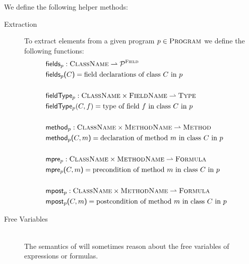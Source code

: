 We define the following helper methods:

\begin{description}
    \item[Extraction]
    To extract elements from a given program $p \in \textup{\textsc{Program}}$ we define the following functions:
    \begin{align*}
         & \textup{\textmd{\textsf{fields$_p$}}} : \textup{\textsc{ClassName}} \rightharpoonup \mathcal{P}^{\textup{\textsc{Field}}}                  &  \\
         & \textup{\textmd{\textsf{fields$_p$($C$)}}} = \text{field declarations of class $C$ in $p$}                              &  \\
         & ~                                                                                       &  \\
    	 & \textup{\textmd{\textsf{fieldType$_p$}}} : \textup{\textsc{ClassName}} \times \textup{\textsc{FieldName}} \rightharpoonup \textup{\textsc{Type}}                & ~ \\
    	 & \textup{\textmd{\textsf{fieldType$_p$}}}(C, f) = \text{type of field $f$ in class $C$ in $p$}                         &  \\
    	 & ~                                                                                       &  \\
    	 & \textup{\textmd{\textsf{method$_p$}}} : \textup{\textsc{ClassName}} \times \textup{\textsc{MethodName}} \rightharpoonup \textup{\textsc{Method}} &  \\
    	 & \textup{\textmd{\textsf{method$_p$($C, m$)}}} = \text{declaration of method $m$ in class $C$ in $p$}                   &  \\
    	 & ~                                                                                       &  \\
    	 & \textup{\textmd{\textsf{mpre$_p$}}} : \textup{\textsc{ClassName}} \times \textup{\textsc{MethodName}} \rightharpoonup \textup{\textsc{Formula}}  &  \\
    	 & \textup{\textmd{\textsf{mpre$_p$($C, m$)}}} = \text{precondition of method $m$ in class $C$ in $p$}                    &  \\
    	 & ~                                                                                       &  \\
    	 & \textup{\textmd{\textsf{mpost$_p$}}} : \textup{\textsc{ClassName}} \times \textup{\textsc{MethodName}} \rightharpoonup \textup{\textsc{Formula}} &  \\
    	 & \textup{\textmd{\textsf{mpost$_p$($C, m$)}}} = \text{postcondition of method $m$ in class $C$ in $p$}                   &
    \end{align*}
    
    \item[Free Variables]~\\
    The semantics of \svlidf will sometimes reason about the free variables of expressions or formulas.
    

\end{description}
